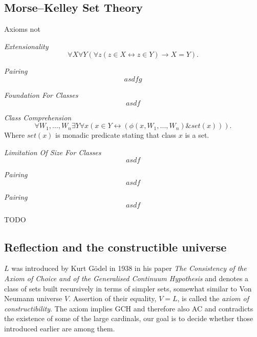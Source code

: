 \documentclass[12pt,a4paper]{article}
\renewcommand{\iff}{\leftrightarrow}
\newcommand{\then}{\rightarrow}
\newcommand{\bce}{\begin{compactenum}}
\newcommand{\ece}{\end{compactenum}}
\begin{document}
\newpage
\subsection{Morse–Kelley Set Theory}
Axioms not 
\bce[(i)]
\item \emph{Extensionality}
\begin{equation}
\forall X \forall Y (\forall z ( z \in X \iff z \in Y) \then X = Y).
\end{equation}
\item \emph{Pairing}
\begin{equation}
asdfg
\end{equation}
\item \emph{Foundation For Classes}
\begin{equation}
asdf
\end{equation}
\item \emph{Class Comprehension}
\begin{equation}
\forall W_1, \ldots, W_n \exists Y \forall x (x \in Y \iff (\phi (x, W_1, \ldots, W_n) \& set(x))).
\end{equation}
Where $set(x)$ is monadic predicate stating that class $x$ is a set.
\item \emph{Limitation Of Size For Classes}
\begin{equation}
asdf
\end{equation}
\item \emph{Pairing}
\begin{equation}
asdf
\end{equation}
\item \emph{Pairing}
\begin{equation}
asdf
\end{equation}
\ece
TODO


\newpage

\subsection{Reflection and the constructible universe}
$L$ was introduced by Kurt Gödel in 1938 in his paper \emph{The Consistency of the Axiom of Choice and of the Generalised Continuum Hypothesis} and denotes a class of sets built recursively in terms of simpler sets, somewhat similar to Von Neumann universe $V$. Assertion of their equality, $V=L$, is called the \emph{axiom of constructibility}. The axiom implies GCH and therefore also AC and contradicts the existence of some of the large cardinals, our goal is to decide whether those introduced earlier are among them.
\end{document}
